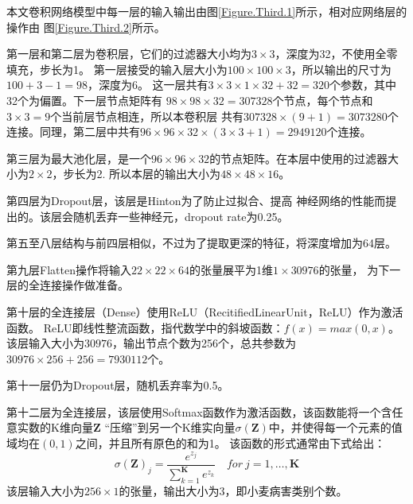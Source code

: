  本文卷积网络模型中每一层的输入输出由图\ref{Figure.Third.1}所示，相对应网络层的操作由
  图\ref{Figure.Third.2}所示。

  第一层和第二层为卷积层，它们的过滤器大小均为$3\times3$，深度为32，不使用全零填充，步长为1。
  第一层接受的输入层大小为$100\times100\times3$，所以输出的尺寸为$100+3-1=98$，深度为6。
  这一层共有$3\times3\times1\times32+32=320$个参数，其中32个为偏置。下一层节点矩阵有
  $98\times98\times32=307328$个节点，每个节点和$3\times3=9$个当前层节点相连，所以本卷积层
  共有$307328\times(9+1)=3073280$个连接。同理，第二层中共有$96\times96\times32\times(3\times3+1)=2949120$个连接。

  第三层为最大池化层，是一个$96\times96\times32$的节点矩阵。在本层中使用的过滤器大小为$2\times2$，步长为2.
  所以本层的输出大小为$48\times48\times16$。

  第四层为Dropout层，该层是Hinton为了防止过拟合、提高
  神经网络的性能而提出的。该层会随机丢弃一些神经元，dropout rate为0.25。

  第五至八层结构与前四层相似，不过为了提取更深的特征，将深度增加为64层。

  第九层Flatten操作将输入$22\times22\times64$的张量展平为1维$1\times30976$的张量，
  为下一层的全连接操作做准备。

  第十层的全连接层（Dense）使用ReLU（RecitifiedLinearUnit，ReLU）作为激活函数。
  ReLU即线性整流函数，指代数学中的斜坡函数：$f(x)=max(0,x)$。
  该层输入大小为$30976$，输出节点个数为256个，总共参数为$30976\times256+256=7930112$个。

  第十一层仍为Dropout层，随机丢弃率为0.5。

  第十二层为全连接层，该层使用Softmax函数作为激活函数，该函数能将一个含任意实数的K维向量$\mathbf{Z}$
  “压缩”到另一个K维实向量$\sigma(\mathbf{Z})$中，并使得每一个元素的值域均在$(0,1)$之间，并且所有原色的和为1。
  该函数的形式通常由下式给出：
  \[
    \sigma(\mathbf{Z})_j=\frac{e^{z_j}}{\sum^\mathbf{K}_{k=1} e^{z_k}} \quad for\ j=1, \dots,\mathbf{K}
  \]
  该层输入大小为$256\times1$的张量，输出大小为3，即小麦病害类别个数。




